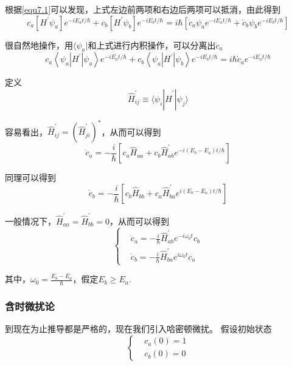 \documentclass[UTF8]{ctexart}
\begin{document}
\noindent 根据\autoref{equ7.1}可以发现，上式左边前两项和右边后两项可以抵消，由此得到
\begin{equation}
    c_{a}\left[H^{\prime} \psi_{a}\right] e^{-i E_{a} t / \hbar}+c_{b}\left[H^{\prime} \psi_{b}\right] e^{-i E_{b} t / \hbar}=i \hbar\left[\dot{c}_{a} \psi_{a} e^{-i E_{a} t / \hbar}+\dot{c}_{b} \psi_{b} e^{-i E_{b} t / \hbar}\right]
\end{equation}

    很自然地操作，用$\langle \psi_a |$和上式进行内积操作，可以分离出$\dot{c}_a$
    \begin{equation}
        c_{a}\left\langle\psi_{a}\left|H^{\prime}\right| \psi_{a}\right\rangle e^{-i E_{a} t / \hbar}+c_{b}\left\langle\psi_{a}\left|H^{\prime}\right| \psi_{b}\right\rangle e^{-i E_{b} t / \hbar}=i \hbar \dot{c}_{a} e^{-i E_{a} t / \hbar}
    \end{equation}

\noindent 定义 
\begin{equation}
    \hat{H}_{ij}^{\prime} \equiv \langle \psi_i | \hat{H}^{\prime}| \psi_j \rangle 
\end{equation}

\noindent 容易看出，$\hat{H}_{ij}^{\prime} = (\hat{H}_{ji}^{\prime})^*$，从而可以得到
\begin{equation}
    \dot{c}_a = - \frac{i}{\hbar} \left[c_a \hat{H}_{aa} + c_b \hat{H}_{ab}^{\prime} e^{-i(E_b-E_a)t/\hbar}\right]
\end{equation}

\noindent 同理可以得到
\begin{equation}
    \dot{c}_b = - \frac{i}{\hbar} \left[c_b \hat{H}_{bb} + c_a \hat{H}_{ba}^{\prime} e^{i(E_b-E_a)t/\hbar}\right]
\end{equation}

    一般情况下，$\hat{H}_{aa}^{\prime} = \hat{H}_{bb}^{\prime} = 0$，从而可以得到
    \begin{equation}
        \left\{\begin{aligned}
            &\dot{c}_a = - \frac{i}{\hbar} \hat{H}_{ab}^{\prime} e^{-i\omega_0 t}c_b \\
            &\dot{c}_b = - \frac{i}{\hbar} \hat{H}_{ba}^{\prime} e^{i\omega_0 t}c_a 
        \end{aligned}\right.\label{equ7.2}
    \end{equation}

\noindent 其中，$\omega_0 = \frac{E_b-E_a}{\hbar}$，假定$E_b \ge E_a$.

    \subsubsection{含时微扰论}
    到现在为止推导都是严格的，现在我们引入哈密顿微扰。
    假设初始状态
    \begin{equation}
        \left\{\begin{aligned}
            &c_a(0) = 1 \\
            &c_b(0) = 0
        \end{aligned}\right.
    \end{equation}
\end{document}
